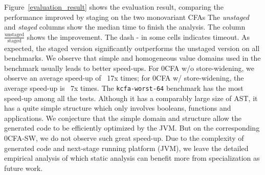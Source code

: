Figure~\ref{evaluation_result} shows the evaluation result, comparing the
performance improved by staging on the two monovariant CFAs The
\textit{unstaged} and \textit{staged} columns show the median time to finish
the analysis. The column $\frac{\text{unstaged}}{\text{staged}}$ shows the
improvement. The dash - in some cells indicates timeout.  As
expected, the staged version significantly outperforms the unstaged version on
all benchmarks. We observe that simple and homogeneous value domains used in the
benchmark usually leads to better speed-ups.  For 0CFA w/o store-widening, we
observe an average speed-up of ~17x times; for 0CFA w/ store-widening, the
average speed-up is ~7x times.  The \texttt{kcfa-worst-64} benchmark has the most
speed-up among all the tests. Although it has a comparably large size of AST,
it has a quite simple structure which only involves booleans, functions and
applications. We conjecture that the simple domain and structure allow the
generated code to be efficiently optimized by the JVM. But on the corresponding
0CFA-SW, we do not observe such great speed-up. Due to the complexity of
generated code and next-stage running platform (JVM), we leave the detailed
empirical analysis of which static analysis can benefit more from
specialization as future work.


